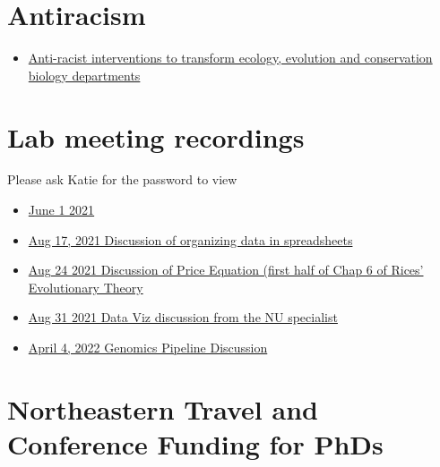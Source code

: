 \documentclass[
  letterpaper,
  DIV=11,
  numbers=noendperiod]{scrreprt}
\providecommand{\tightlist}{%
  \setlength{\itemsep}{0pt}\setlength{\parskip}{0pt}}\usepackage{longtable,booktabs,array}
\begin{document}
\hypertarget{antiracism}{%
\section*{\texorpdfstring{\textbf{Antiracism}}{Antiracism}}\label{antiracism}}

\begin{itemize}
\tightlist
\item
  \href{https://www.nature.com/articles/s41559-021-01522-z}{Anti-racist
  interventions to transform ecology, evolution and conservation biology
  departments}
\end{itemize}

\hypertarget{lab-meeting-recordings}{%
\section*{\texorpdfstring{\textbf{Lab meeting
recordings}}{Lab meeting recordings}}\label{lab-meeting-recordings}}

Please ask Katie for the password to view

\begin{itemize}
\item
  \href{https://northeastern.zoom.us/rec/share/enHUqKE7sr-bq6gpBMBOsu2-vPz3YsobBGADU2wNAgl80B-O9ijm86bx9kxOiboj.nYjVibVUxw51caKb}{June
  1 2021}
\item
  \href{https://northeastern.zoom.us/rec/share/8Z6w6mkq-XTPgyDJU_zcLIp0M5U9tTh5rGo5bhlXdIfKR7vbV4bZsA2Nm3rxvbfv.d3krLgGquGjjO5CP}{Aug
  17, 2021 Discussion of organizing data in spreadsheets}
\item
  \href{https://northeastern.zoom.us/rec/share/9JS5ZfB-eySzp6VqK24pHh4bNft2uPhd8wLx3b7J2ycq1IQd4hxxt8bvcXs8WfJs.3dgAcoKa9fQZArZR}{Aug
  24 2021 Discussion of Price Equation (first half of Chap 6 of Rices'
  Evolutionary Theory}
\item
  \href{https://northeastern.zoom.us/rec/share/L4GY5DKi6XCi1nf8_RxkzyGyu6NAojZd4nsNsL1WpxiEfNp5qe_PHd5An9ngPANS.49r97rNHCjo5PNSH}{Aug
  31 2021 Data Viz discussion from the NU specialist}
\item
  \href{https://drive.google.com/file/d/1PGqdpTqKoK9ShX6yj6hNiqI7VVO43gOv/view?usp=sharing}{April
  4, 2022 Genomics Pipeline Discussion}
\end{itemize}

\hypertarget{northeastern-travel-and-conference-funding-for-phds}{%
\section*{\texorpdfstring{\textbf{Northeastern Travel and Conference
Funding for
PhDs}}{Northeastern Travel and Conference Funding for PhDs}}\label{northeastern-travel-and-conference-funding-for-phds}}
\end{document}
